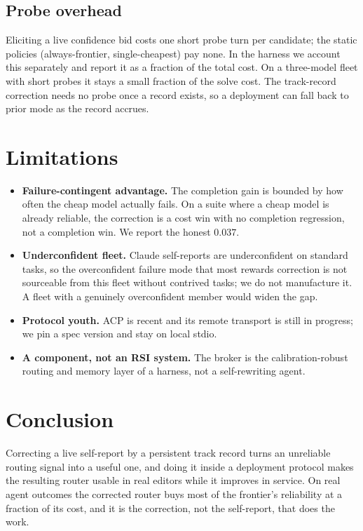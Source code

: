 \documentclass[11pt]{article}
\begin{document}
\subsection{Probe overhead}
Eliciting a live confidence bid costs one short probe turn per candidate; the static policies (always-frontier, single-cheapest) pay none. In the harness we account this separately and report it as a fraction of the total cost. On a three-model fleet with short probes it stays a small fraction of the solve cost. The track-record correction needs no probe once a record exists, so a deployment can fall back to prior mode as the record accrues.

\section{Limitations}
\begin{itemize}\itemsep2pt
\item \textbf{Failure-contingent advantage.} The completion gain is bounded by how often the cheap model actually fails. On a suite where a cheap model is already reliable, the correction is a cost win with no completion regression, not a completion win. We report the honest $0.037$.
\item \textbf{Underconfident fleet.} Claude self-reports are underconfident on standard tasks, so the overconfident failure mode that most rewards correction is not sourceable from this fleet without contrived tasks; we do not manufacture it. A fleet with a genuinely overconfident member would widen the gap.
\item \textbf{Protocol youth.} ACP is recent and its remote transport is still in progress; we pin a spec version and stay on local stdio.
\item \textbf{A component, not an RSI system.} The broker is the calibration-robust routing and memory layer of a harness, not a self-rewriting agent.
\end{itemize}

\section{Conclusion}
Correcting a live self-report by a persistent track record turns an unreliable routing signal into a useful one, and doing it inside a deployment protocol makes the resulting router usable in real editors while it improves in service. On real agent outcomes the corrected router buys most of the frontier's reliability at a fraction of its cost, and it is the correction, not the self-report, that does the work.



\end{document}
